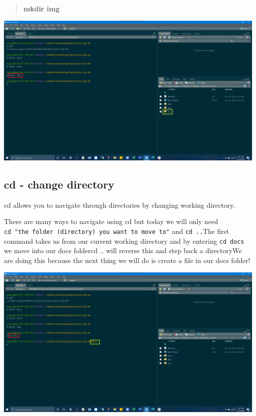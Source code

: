 \documentclass[
]{article}
\begin{document}
\begin{quote}
\textbf{mkdir img}
\end{quote}

\includegraphics{img/mkdir-img.png}

\hypertarget{cd---change-directory}{%
\subsection{\texorpdfstring{{cd} - change
directory}{cd - change directory}}\label{cd---change-directory}}

cd allows you to navigate through directories by changing working
directory.

There are many ways to navigate using {cd} but today we will only need
\texttt{cd\ "the\ folder\ (directory)\ you\ want\ to\ move\ to"} and
\texttt{cd\ ..}The first command takes us from our current working
directory and by entering \texttt{cd\ docs} we move into our docs
folder{cd ..} will reverse this and step back a directoryWe are doing
this because the next thing we will do is create a file in our docs
folder!

\includegraphics{img/cd-docs.png}
\end{document}
